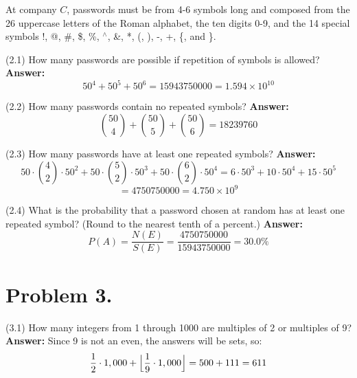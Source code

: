 \documentclass[11pt]{article}
\begin{document}
\noindent
At company $C$, passwords must be from 4-6 symbols long and composed from the
26 uppercase letters of the Roman alphabet, the ten digits 0-9, and the 14
special symbols !, @, \#, \$, \%, $^{\wedge}$, \&, *, (, ), -, +, \{, and \}.
\newline

\noindent
(2.1) How many passwords are possible if repetition of symbols is allowed?
\newline
\newline
\noindent
{\bf Answer:}\\
\[50^4 + 50^5 + 50^6 = 15943750000 = 1.594 \times 10^{10}\]
\newline

\noindent
(2.2) How many passwords contain no repeated symbols?
\newline
\newline
\noindent
{\bf Answer:}\\
\[{50 \choose 4} + {50 \choose 5} + {50 \choose 6} = 18239760\]
\newline

\noindent
(2.3) How many passwords have at least one repeated symbols?
\newline
\newline
\noindent
{\bf Answer:}\\
\[50\cdot {4 \choose 2}\cdot50^2 + 50\cdot {5 \choose 2}\cdot50^3 + 50\cdot {6 \choose 2}\cdot50^4 = 6\cdot 50^3 + 10\cdot 50^4 + 15\cdot 50^5 \]
\[= 4750750000 = 4.750 \times 10^9\]
\newline

\noindent
(2.4) What is the probability that a password chosen at random has at least one repeated symbol? (Round to the nearest tenth of a percent.)
\newline
\newline
\noindent
{\bf Answer:}\\
\[P(A) = \frac{N(E)}{S(E)} = \frac{4750750000}{15943750000} = 30.0\%\]
\newpage


\section*{Problem 3.}

\noindent
(3.1) How many integers from 1 through 1000 are multiples of 2 or multiples of 9?
\newline
\newline
\noindent
{\bf Answer:}
\newline
Since 9 is not an even, the answers will be sets, so: 
\[\frac{1}{2}\cdot 1,000 + \Bigl\lfloor \frac{1}{9} \cdot 1,000 \Bigr\rfloor = 500 + 111 = 611\]
\newline
\end{document}
